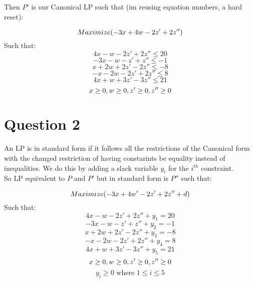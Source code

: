 \documentclass{article}
\numberwithin{equation}{subsection}
\begin{document}
	\newpage
	Then $P'$ is our Canonical LP such that (im reusing equation numbers, a hard reset):

	\begin{equation}\notag
		Maximize(-3x+4w-2z'+2z'')
	\end{equation}
	Such that:
	\begin{equation}\tag{1}
		4x-w-2z'+2z''\leq20	
	\end{equation}
	\begin{equation}\tag{2}
		-3x-w-z'+z''\leq-1	
	\end{equation}
	\begin{equation}\tag{3}
		x+2w+2z'-2z''\leq-8
	\end{equation}
	\begin{equation}\tag{4}
		-x-2w-2z'+2z''\leq8	
	\end{equation}
	\begin{equation}\tag{5}
		4x+w+3z'-3z''\leq21	
	\end{equation}
	\begin{equation}\notag
		x\ge0, w\ge0, z'\ge0, z''\ge0	
	\end{equation}


	\newpage 
	\section{Question 2}
	\par{
		An LP is in standard form if it follows all the restrictions of the Canonical form
		with the changed restriction of having constarints be equality instead of inequalities.
		We do this by adding a slack variable $y_i$ for the $i^{th}$ constraint.\\ 
		So LP equivalent to $P$ and $P'$ but in standard form is $P''$ such that:
	}

	\begin{equation}\notag
		Maximize(-3x+4w'-2z'+2z'' +d)
	\end{equation}
	Such that:
	\begin{equation}\tag{1}
		4x-w-2z'+2z''+y_1=20	
	\end{equation}
	\begin{equation}\tag{2}
		-3x-w-z'+z''+y_2=-1	
	\end{equation}
	\begin{equation}\tag{3}
		x+2w+2z'-2z''+y_3=-8
	\end{equation}
	\begin{equation}\tag{4}
		-x-2w-2z'+2z''+y_4=8	
	\end{equation}
	\begin{equation}\tag{5}
		4x+w+3z'-3z''+y_5=21	
	\end{equation}
	\begin{equation}\notag
		x\ge0, w\ge0, z'\ge0, z''\ge0
	\end{equation}
	\begin{equation}
		y_i\ge0 \text{ where } 1\le i\le5	
	\end{equation}
\end{document}
